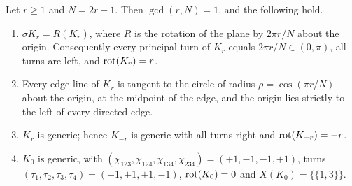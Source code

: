 \begin{lemma}\label{lem:star-generic}
Let $r\geq1$ and $N=2r+1$. Then $\gcd(r,N)=1$, and the following hold.
\begin{enumerate}
\item[(i)] $\sigma K_r=R(K_r)$, where $R$ is the rotation of the plane by
$2\pi r/N$ about the origin. Consequently every principal turn of $K_r$
equals $2\pi r/N\in(0,\pi)$, all turns are left, and $\operatorname{rot}(K_r)=r$.
\item[(ii)] Every edge line of $K_r$ is tangent to the circle of radius
$\rho=\cos(\pi r/N)$ about the origin, at the midpoint of the edge, and the
origin lies strictly to the left of every directed edge.
\item[(iii)] $K_r$ is generic; hence $K_{-r}$ is generic with all turns
right and $\operatorname{rot}(K_{-r})=-r$.
\item[(iv)] $K_0$ is generic, with
$(\chi_{123},\chi_{124},\chi_{134},\chi_{234})=(+1,-1,-1,+1)$, turns
$(\tau_1,\tau_2,\tau_3,\tau_4)=(-1,+1,+1,-1)$, $\operatorname{rot}(K_0)=0$ and
$X(K_0)=\{\{1,3\}\}$.
\end{enumerate}
\end{lemma}
